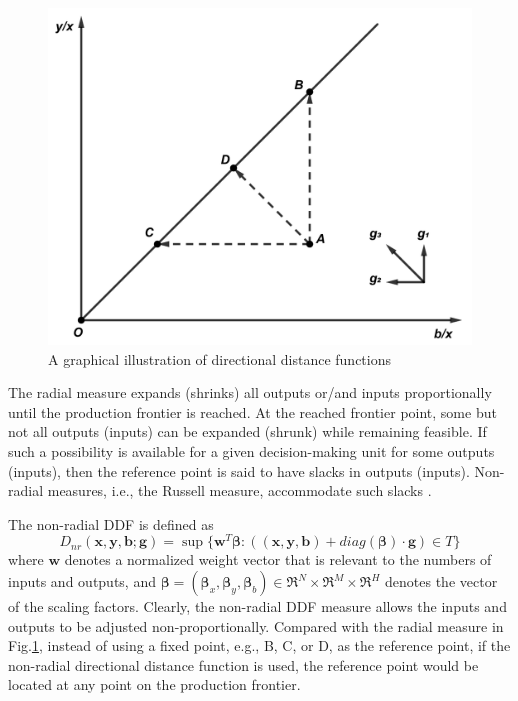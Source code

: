 \begin{figure}[ht]
    \centering
    \includegraphics[scale=0.5]{SJF1.pdf}
    \caption{A graphical illustration of directional distance functions} 
    \label{fig_ddf}
\end{figure}

The radial measure expands (shrinks) all outputs or/and inputs proportionally until the production frontier is reached. At the reached frontier point, some but not all outputs (inputs) can be expanded (shrunk) while remaining feasible. If such a possibility is available for a given decision-making unit for some outputs (inputs), then the reference point is said to have slacks in outputs (inputs). Non-radial measures, i.e., the Russell measure, accommodate such slacks \citep{Chambers2002,Fare2010,Zhou2012}.

The non-radial DDF is defined as
\begin{equation}\label{eq_ddf_nr}
    D_{nr} (\pmb{x},\pmb{y},\pmb{b};\pmb{g}) = \sup \{ \pmb{w}^T \pmb{\beta} :((\pmb{x},\pmb{y},\pmb{b}) + \textit{diag}(\pmb{\beta}) \cdot \pmb{g}) \in T \} 
\end{equation}
where $\pmb{w}$ denotes a normalized weight vector that is relevant to the numbers of inputs and outputs, and ${\pmb{\beta }} = ({{\pmb{\beta }}_x},{{\pmb{\beta }}_y},{{\pmb{\beta }}_b}) \in {\Re ^N} \times {\Re ^M} \times {\Re ^H}$ denotes the vector of the scaling factors. 
Clearly, the non-radial DDF measure allows the inputs and outputs to be adjusted non-proportionally. Compared with the radial measure in Fig.\ref{fig_ddf}, instead of using a fixed point, e.g., B, C, or D, as the reference point, if the non-radial directional distance function is used, the reference point would be located at any point on the production frontier.
 

